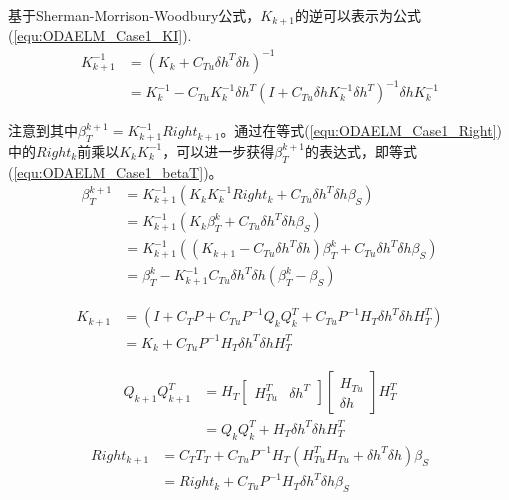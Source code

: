 基于Sherman-Morrison-Woodbury公式，$K_{k+1}$的逆可以表示为公式(\ref{equ:ODAELM_Case1_KI}).
\begin{equation}
\label{equ:ODAELM_Case1_KI}
\begin{aligned}
K_{k+1}^{-1}&=(K_{k}+C_{Tu}\delta h^T \delta h)^{-1} \\
& =K_{k}^{-1}-C_{Tu}K_{k}^{-1} \delta h^T (I+ C_{Tu} \delta h K_{k}^{-1} \delta h^T)^{-1} \delta h K_{k}^{-1}
\end{aligned}
\end{equation}

注意到其中$\beta_{T}^{k+1}=K_{k+1}^{-1} Right_{k+1}$。通过在等式(\ref{equ:ODAELM_Case1_Right})中的$Right_{k}$前乘以$K_k K_k^{-1}$，可以进一步获得$\beta_T^{k+1}$的表达式，即等式(\ref{equ:ODAELM_Case1_betaT})。
\begin{equation}
\label{equ:ODAELM_Case1_betaT}
\begin{aligned}
\beta_T^{k+1}&=K_{k+1}^{-1} (K_k K_k^{-1} Right_k + C_{Tu} \delta h^T \delta h \beta_S) \\
&=K_{k+1}^{-1}(K_k \beta_T^{k} + C_{Tu}\delta h^T \delta h \beta_S)\\
&=K_{k+1}^{-1}((K_{k+1}-C_{Tu} \delta h^T \delta h)\beta_T^{k}+C_{Tu} \delta h^T \delta h \beta_S) \\
&=\beta_T^{k} - K_{k+1}^{-1} C_{Tu} \delta h^T \delta h (\beta_T^{k} -\beta_S)
\end{aligned}
\end{equation}

\begin{equation}
\label{equ:ODAELM_Case2_K}
\begin{aligned}
K_{k+1}&=(I+C_T P + C_{Tu} P^{-1} Q_k Q_k^T +C_{Tu} P^{-1}H_T \delta h^T \delta h H_T^T) \\
&  = K_k +C_{Tu} P^{-1} H_T \delta h^T \delta h H_T^T	
\end{aligned}
\end{equation}

\begin{equation}
\label{eua:ODAELM_Case2_Qk1}
\begin{aligned}
Q_{k+1} Q_{k+1}^T &= H_T \left[ \begin{matrix}
H_{Tu}^T & \delta h^T 
\end{matrix}\right]
\left[
\begin{matrix}
H_{Tu} \\ \delta h
\end{matrix}\right]
H_T^T \\
& =Q_k Q_k^T + H_T \delta h^T \delta h H_T^T
\end{aligned}
\end{equation}
\begin{equation}
\label{equ:ODAELM_Case2_Right}
\begin{aligned}
Right_{k+1}&=C_T T_T + C_{Tu} P^{-1}H_T (H_{Tu}^T H_{Tu} + \delta h^T \delta h) \beta_S \\
& = Right_k +C_{Tu} P^{-1} H_T \delta h^T \delta h \beta_S
\end{aligned}
\end{equation}

